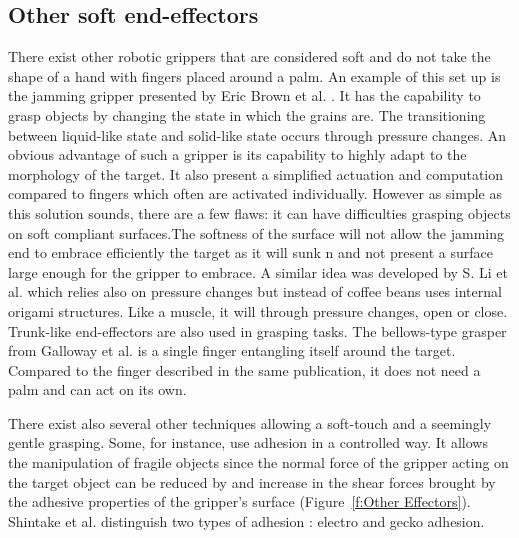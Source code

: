 \subsection{Other soft end-effectors}
\label{s:OtherSoftManipulators}

There exist other robotic grippers that are considered soft and do not take the shape of a hand with fingers placed around a palm. An example of this set up is the jamming gripper presented by Eric Brown et al. \cite{brown2010universal, amend2012positive} . It has the capability to grasp objects by changing the state in which the grains are. The transitioning between liquid-like state and solid-like state occurs through pressure changes. An obvious advantage of such a gripper is its capability to highly adapt to the morphology of the target. It also present a simplified actuation and computation compared to fingers which often are activated individually. However as simple as this solution sounds, there are a few flaws: it can have difficulties grasping objects on soft compliant surfaces.The softness of the surface  will not allow the jamming end to embrace efficiently the target as it will sunk n and not present a surface large enough for the gripper to embrace. A similar idea was developed by S. Li et al. \cite{li2017fluid} which relies also on pressure changes but instead of coffee beans uses internal origami structures. Like a muscle, it will through pressure changes, open or close. Trunk-like end-effectors are also used in grasping tasks. The bellows-type grasper from Galloway et al. \cite{galloway2016soft} is a single finger entangling itself around the target. Compared to the finger described in the same publication, it does not need a palm and can act on its own. 

There exist also several other techniques allowing a soft-touch and a seemingly gentle grasping. Some, for instance, use adhesion in a controlled way. It allows the manipulation of fragile objects since the normal force of the gripper acting on the target object can be reduced by and increase in the shear forces brought by the adhesive properties of the gripper's surface \cite{shintake2016versatile, shintake2018soft} (Figure~\ref{f:Other Effectors}). Shintake et al. \cite{shintake2018soft} distinguish two types of adhesion : electro and gecko adhesion. 

